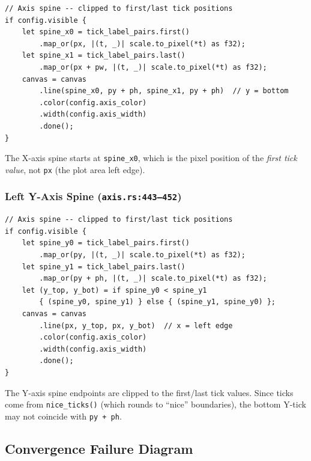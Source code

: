 \documentclass[11pt,a4paper]{article}
\begin{document}
\begin{lstlisting}[firstnumber=365]
// Axis spine -- clipped to first/last tick positions
if config.visible {
    let spine_x0 = tick_label_pairs.first()
        .map_or(px, |(t, _)| scale.to_pixel(*t) as f32);
    let spine_x1 = tick_label_pairs.last()
        .map_or(px + pw, |(t, _)| scale.to_pixel(*t) as f32);
    canvas = canvas
        .line(spine_x0, py + ph, spine_x1, py + ph)  // y = bottom
        .color(config.axis_color)
        .width(config.axis_width)
        .done();
}
\end{lstlisting}

The X-axis spine starts at \texttt{spine\_x0}, which is the pixel position
of the \emph{first tick value}, not \texttt{px} (the plot area left edge).

\subsubsection{Left Y-Axis Spine (\texttt{axis.rs:443--452})}

\begin{lstlisting}[firstnumber=443]
// Axis spine -- clipped to first/last tick positions
if config.visible {
    let spine_y0 = tick_label_pairs.first()
        .map_or(py, |(t, _)| scale.to_pixel(*t) as f32);
    let spine_y1 = tick_label_pairs.last()
        .map_or(py + ph, |(t, _)| scale.to_pixel(*t) as f32);
    let (y_top, y_bot) = if spine_y0 < spine_y1
        { (spine_y0, spine_y1) } else { (spine_y1, spine_y0) };
    canvas = canvas
        .line(px, y_top, px, y_bot)  // x = left edge
        .color(config.axis_color)
        .width(config.axis_width)
        .done();
}
\end{lstlisting}

The Y-axis spine endpoints are clipped to the first/last tick values.
Since ticks come from \texttt{nice\_ticks()} (which rounds to ``nice''
boundaries), the bottom Y-tick may not coincide with \texttt{py + ph}.

\subsection{Convergence Failure Diagram}
\end{document}

